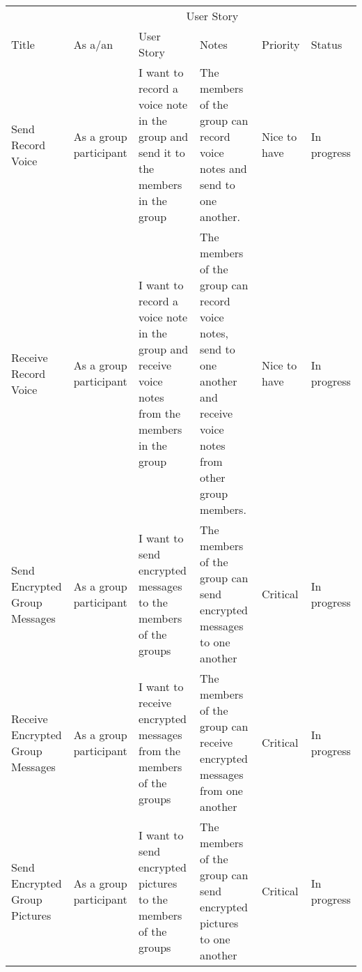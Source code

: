 \documentclass[a4paper]{article}
\begin{document}
\vspace{\baselineskip}
\begin{table} 
\begin{tabular}{p{2cm} p{2.5cm} p{3cm} p{3cm} p{1cm} p{0.75cm}} %
\hline %
& \multicolumn{5}{c}{User Story} \\ %
\cmidrule(l){2-6} %
Title & As a/an & User Story & Notes & Priority & Status\\ %
\hline %

Send Record Voice & As a group participant & I want to record a voice note in the group and send it to the members in the group & The members of the group can record voice notes and send to one another. & Nice to have & In progress\\ \cmidrule(l){2-6} %

Receive Record Voice & As a group participant & I want to record a voice note in the group and receive voice notes from the members in the group & The members of the group can record voice notes, send to one another and receive voice notes from other group members. & Nice to have & In progress\\ \cmidrule(l){2-6}%

Send Encrypted Group Messages & As a group participant & I want to send encrypted messages to the members of the groups & The members of the group can send encrypted messages to one another & Critical & In progress\\ \cmidrule(l){2-6}%

Receive Encrypted Group Messages & As a group participant & I want to receive encrypted messages from the members of the groups & The members of the group can receive encrypted messages from one another & Critical & In progress\\ \cmidrule(l){2-6}%

Send Encrypted Group Pictures & As a group participant & I want to send encrypted pictures to the members of the groups & The members of the group can send encrypted pictures to one another & Critical & In progress\\ \cmidrule(l){2-6} %


\end{tabular}
\end{table}
\end{document}
